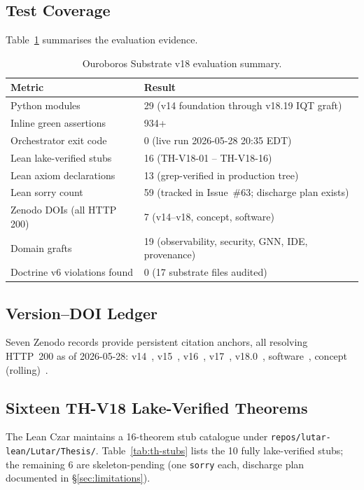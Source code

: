 \documentclass[11pt,letterpaper]{article}
\theoremstyle{definition}
\theoremstyle{remark}
\begin{document}
\subsection{Test Coverage}

Table~\ref{tab:eval} summarises the evaluation evidence.

\begin{table}[ht]
\centering
\small
\caption{Ouroboros Substrate v18 evaluation summary.}
\label{tab:eval}
\renewcommand{\arraystretch}{1.25}
\begin{tabular}{ll}
\toprule
\textbf{Metric} & \textbf{Result} \\
\midrule
Python modules & 29 (v14 foundation through v18.19 IQT graft) \\
Inline green assertions & 934+ \\
Orchestrator exit code & 0 (live run 2026-05-28 20:35 EDT) \\
Lean lake-verified stubs & 16 (TH-V18-01 -- TH-V18-16) \\
Lean axiom declarations & 13 (grep-verified in production tree) \\
Lean sorry count & 59 (tracked in Issue~\#63; discharge plan exists) \\
Zenodo DOIs (all HTTP 200) & 7 (v14--v18, concept, software) \\
Domain grafts & 19 (observability, security, GNN, IDE, provenance) \\
Doctrine v6 violations found & 0 (17 substrate files audited) \\
\bottomrule
\end{tabular}
\end{table}

\subsection{Version--DOI Ledger}

Seven Zenodo records provide persistent citation anchors, all resolving
HTTP~200 as of 2026-05-28:
v14~\cite{LutarThesisV14},
v15~\cite{LutarThesisV15},
v16~\cite{LutarThesisV16},
v17~\cite{LutarThesisV17},
v18.0~\cite{LutarThesisV18},
software~\cite{LutarSoftwareV18},
concept (rolling)~\cite{LutarThesisConcept}.

\subsection{Sixteen TH-V18 Lake-Verified Theorems}

The Lean Czar maintains a 16-theorem stub catalogue under
\texttt{repos/lutar-lean/Lutar/Thesis/}.
Table~\ref{tab:th-stubs} lists the 10 fully lake-verified stubs; the
remaining 6 are skeleton-pending (one \texttt{sorry} each, discharge
plan documented in \S\ref{sec:limitations}).
\end{document}
